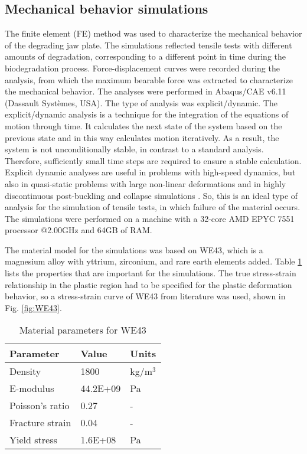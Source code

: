 \subsection{Mechanical behavior simulations}
\label{sec:FEA}

The finite element (FE) method was used to characterize the mechanical behavior of the degrading jaw plate. The simulations reflected tensile tests with different amounts of degradation, corresponding to a different point in time during the biodegradation process. Force-displacement curves were recorded during the analysis, from which the maximum bearable force was extracted to characterize the mechanical behavior. The analyses were performed in Abaqus/CAE v6.11 (Dassault Systèmes, USA). The type of analysis was explicit/dynamic. The explicit/dynamic analysis is a technique for the integration of the equations of motion through time. It calculates the next state of the system based on the previous state and in this way calculates motion iteratively. As a result, the system is not unconditionally stable, in contrast to a standard analysis. Therefore, sufficiently small time steps are required to ensure a stable calculation. Explicit dynamic analyses are useful in problems with high-speed dynamics, but also in quasi-static problems with large non-linear deformations and in highly discontinuous post-buckling and collapse simulations \cite{explicit2}. So, this is an ideal type of analysis for the simulation of tensile tests, in which failure of the material occurs. The simulations were performed on a machine with a 32-core AMD EPYC 7551 processor @2.00GHz and 64GB of RAM.

The material model for the simulations was based on WE43, which is a magnesium alloy with yttrium, zirconium, and rare earth elements added. Table \ref{tab:WE43} lists the properties that are important for the simulations. The true stress-strain relationship in the plastic region had to be specified for the plastic deformation behavior, so a stress-strain curve of WE43 from literature was used, shown in Fig. \ref{fig:WE43}.

\begin{table}[h]
\centering
\begin{tabular}{|l|l|l|} 
\hline
\textbf{Parameter} & \textbf{Value} & \textbf{Units}  \\ 
\hline
Density            & 1800           & kg/m$^3$        \\ 
\hline
E-modulus          & 44.2E+09       & Pa              \\ 
\hline
Poisson's ratio    & 0.27           & -               \\ 
\hline
Fracture strain    & 0.04           & -               \\ 
\hline
Yield stress       & 1.6E+08        & Pa              \\
\hline
\end{tabular}
\caption{Material parameters for WE43}
\label{tab:WE43}
\end{table}

